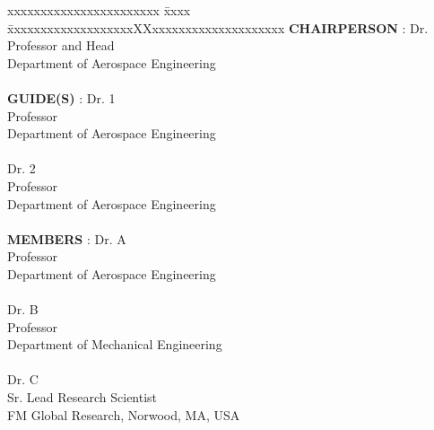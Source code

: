 \committee
\label{cmte}

\begin{tabbing}
	xxxxxxxxxxxxxxxxxxxxxxx \= xxxx \= xxxxxxxxxxxxxxxxxxxXXxxxxxxxxxxxxxxxxxxxx \kill
	\textbf{CHAIRPERSON}   \>:\> Dr. 
	\\ \> \> Professor and Head
	\\ \> \> Department of Aerospace Engineering \\
	\\ %
	\textbf{GUIDE(S)}   \>:\> Dr. 1
	\\ \> \> Professor
	\\ \> \> Department of Aerospace Engineering
	\\ %
	\\ \> \> Dr. 2
	\\ \> \> Professor
	\\ \> \> Department of Aerospace Engineering \\
	\\ %
	\textbf{MEMBERS}   \>:\> Dr. A
	\\ \> \> Professor
	\\ \> \> Department of Aerospace Engineering 
	\\ %
	\\ \> \> Dr. B
	\\ \> \> Professor
	\\ \> \> Department of Mechanical Engineering 
	\\ %
	\\ \> \> Dr. C
	\\ \> \> Sr. Lead Research Scientist
	\\ \> \> FM Global Research, Norwood, MA, USA

	\\
	
\end{tabbing}
